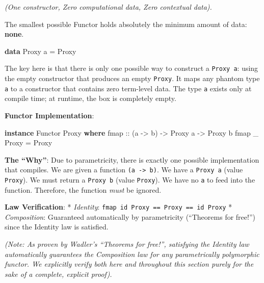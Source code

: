 \documentclass[
]{article}
\newenvironment{Shaded}{}{}
\newcommand{\DataTypeTok}[1]{\textcolor[rgb]{0.56,0.13,0.00}{#1}}
\newcommand{\FunctionTok}[1]{\textcolor[rgb]{0.02,0.16,0.49}{#1}}
\newcommand{\KeywordTok}[1]{\textcolor[rgb]{0.00,0.44,0.13}{\textbf{#1}}}
\newcommand{\NormalTok}[1]{#1}
\newcommand{\OtherTok}[1]{\textcolor[rgb]{0.00,0.44,0.13}{#1}}
\begin{document}
\emph{(One constructor, Zero computational data, Zero contextual data).}

The smallest possible Functor holds absolutely the minimum amount of
data: \textbf{none}.

\begin{Shaded}
\begin{Highlighting}[]
\KeywordTok{data} \DataTypeTok{Proxy}\NormalTok{ a }\OtherTok{=} \DataTypeTok{Proxy}
\end{Highlighting}
\end{Shaded}

The key here is that there is only one possible way to construct a
\texttt{Proxy\ a}: using the empty constructor that produces an empty
\texttt{Proxy}. It maps any phantom type \texttt{a} to a constructor
that contains zero term-level data. The type \texttt{a} exists only at
compile time; at runtime, the box is completely empty.

\textbf{Functor Implementation}:

\begin{Shaded}
\begin{Highlighting}[]
\KeywordTok{instance} \DataTypeTok{Functor} \DataTypeTok{Proxy} \KeywordTok{where}
\OtherTok{    fmap ::}\NormalTok{ (a }\OtherTok{{-}\textgreater{}}\NormalTok{ b) }\OtherTok{{-}\textgreater{}} \DataTypeTok{Proxy}\NormalTok{ a }\OtherTok{{-}\textgreater{}} \DataTypeTok{Proxy}\NormalTok{ b}
    \FunctionTok{fmap}\NormalTok{ \_ }\DataTypeTok{Proxy} \OtherTok{=} \DataTypeTok{Proxy}
\end{Highlighting}
\end{Shaded}

\textbf{The ``Why''}: Due to parametricity, there is exactly one
possible implementation that compiles. We are given a function
\texttt{(a\ -\textgreater{}\ b)}. We have a \texttt{Proxy\ a} (value
\texttt{Proxy}). We must return a \texttt{Proxy\ b} (value
\texttt{Proxy}). We have no \texttt{a} to feed into the function.
Therefore, the function \emph{must} be ignored.

\textbf{Law Verification}: * \emph{Identity}:
\texttt{fmap\ id\ Proxy\ ==\ Proxy\ ==\ id\ Proxy} * \emph{Composition}:
Guaranteed automatically by parametricity (``Theorems for free!'') since
the Identity law is satisfied.

\emph{(Note: As proven by Wadler's ``Theorems for free!'', satisfying
the Identity law automatically guarantees the Composition law for any
parametrically polymorphic functor. We explicitly verify both here and
throughout this section purely for the sake of a complete, explicit
proof).}
\end{document}
